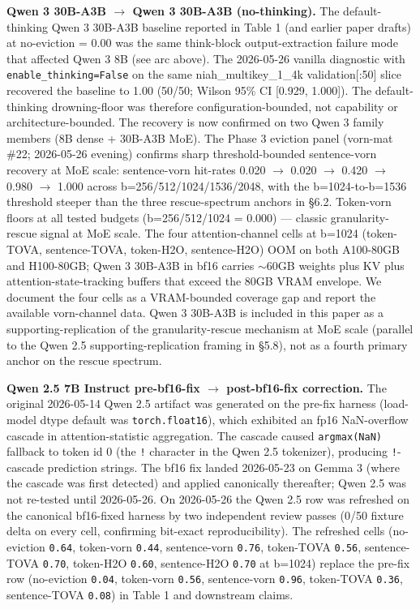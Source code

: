 \documentclass[10pt]{article}
\begin{document}
\textbf{Qwen 3 30B-A3B $\rightarrow$ Qwen 3 30B-A3B (no-thinking).} The
default-thinking Qwen 3 30B-A3B baseline reported in Table 1 (and
earlier paper drafts) at no-eviction = 0.00 was the same think-block
output-extraction failure mode that affected Qwen 3 8B (see arc above).
The 2026-05-26 vanilla diagnostic with \texttt{enable\_thinking=False}
on the same niah\_multikey\_1\_4k validation[:50] slice recovered the
baseline to 1.00 (50/50; Wilson 95\% CI [0.929, 1.000]). The
default-thinking drowning-floor was therefore configuration-bounded, not
capability or architecture-bounded. The recovery is now confirmed on
two Qwen 3 family members (8B dense + 30B-A3B MoE). The Phase 3
eviction panel (vorn-mat \#22; 2026-05-26 evening) confirms sharp
threshold-bounded sentence-vorn recovery at MoE scale: sentence-vorn
hit-rates 0.020 $\rightarrow$ 0.020 $\rightarrow$ 0.420 $\rightarrow$
0.980 $\rightarrow$ 1.000 across b=256/512/1024/1536/2048, with the
b=1024-to-b=1536 threshold steeper than the three rescue-spectrum
anchors in \S{}6.2. Token-vorn floors at all tested budgets
(b=256/512/1024 = 0.000) --- classic granularity-rescue signal at MoE
scale. The four attention-channel cells at b=1024 (token-TOVA,
sentence-TOVA, token-H2O, sentence-H2O) OOM on both A100-80GB and
H100-80GB; Qwen 3 30B-A3B in bf16 carries $\sim$60GB weights plus KV
plus attention-state-tracking buffers that exceed the 80GB VRAM
envelope. We document the four cells as a VRAM-bounded coverage gap
and report the available vorn-channel data. Qwen 3 30B-A3B is included
in this paper as a supporting-replication of the granularity-rescue
mechanism at MoE scale (parallel to the Qwen 2.5 supporting-replication
framing in \S{}5.8), not as a fourth primary anchor on the rescue
spectrum.

\textbf{Qwen 2.5 7B Instruct pre-bf16-fix $\rightarrow$ post-bf16-fix correction.}
The original 2026-05-14 Qwen 2.5 artifact was generated on the pre-fix
harness (load-model dtype default was \texttt{torch.float16}), which
exhibited an fp16 NaN-overflow cascade in attention-statistic
aggregation. The cascade caused \texttt{argmax(NaN)} fallback to token
id 0 (the \texttt{!} character in the Qwen 2.5 tokenizer), producing
\texttt{!}-cascade prediction strings. The bf16 fix landed 2026-05-23
on Gemma 3 (where the cascade was first detected) and applied
canonically thereafter; Qwen 2.5 was not re-tested until 2026-05-26.
On 2026-05-26 the Qwen 2.5 row was refreshed on the canonical
bf16-fixed harness by two independent review passes (0/50 fixture delta
on every cell, confirming
bit-exact reproducibility). The refreshed cells (no-eviction
\texttt{0.64}, token-vorn \texttt{0.44}, sentence-vorn \texttt{0.76},
token-TOVA \texttt{0.56}, sentence-TOVA \texttt{0.70}, token-H2O
\texttt{0.60}, sentence-H2O \texttt{0.70} at b=1024) replace the
pre-fix row (no-eviction \texttt{0.04}, token-vorn \texttt{0.56},
sentence-vorn \texttt{0.96}, token-TOVA \texttt{0.36}, sentence-TOVA
\texttt{0.08}) in Table 1 and downstream claims.
\end{document}
